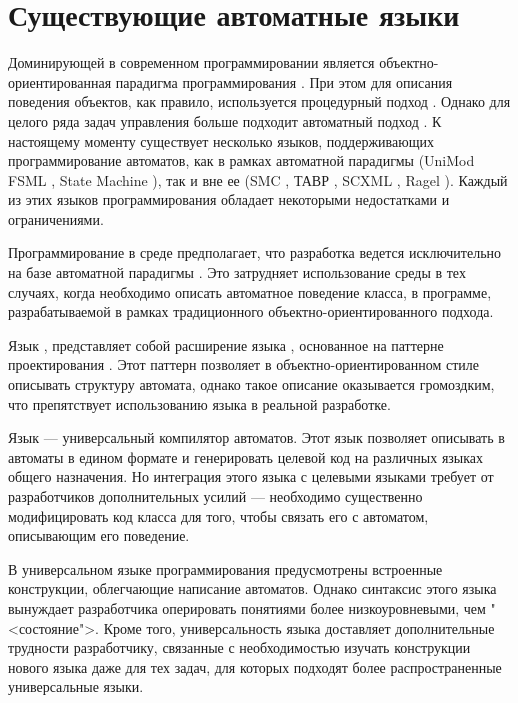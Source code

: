 \section{Существующие автоматные языки}
Доминирующей в современном программировании является объектно-ориентированная парадигма программирования \cite{meyer}. При этом для описания поведения объектов, как правило, используется процедурный подход \cite{nepeyvoda}. Однако для целого ряда задач управления больше подходит автоматный подход \cite{shalyto01,shalyto02}. К настоящему моменту существует несколько языков, поддерживающих программирование автоматов, как в рамках автоматной парадигмы (UniMod FSML \cite{lagunov}, State Machine \cite{shamgunov}), так и вне ее (SMC \cite{smc}, ТАВР \cite{tsimbaluk}, SCXML \cite{scxml}, Ragel \cite{ragel}). Каждый из этих языков программирования обладает некоторыми недостатками и ограничениями.

Программирование в среде  предполагает, что разработка ведется исключительно на базе автоматной парадигмы \cite{myUMLSwitchEclipse}. Это затрудняет использование среды  в тех случаях, когда необходимо описать автоматное поведение класса, в программе, разрабатываемой в рамках традиционного объектно-ориентированного подхода.

Язык , представляет собой расширение языка , основанное на паттерне проектирования  \cite{gof}. Этот паттерн позволяет в объектно-ориентированном стиле описывать структуру автомата, однако такое описание оказывается громоздким, что препятствует использованию языка  в реальной разработке.

Язык  --- универсальный компилятор автоматов. Этот язык позволяет описывать в автоматы в едином формате и генерировать целевой код на различных языках общего назначения. Но интеграция этого языка с целевыми языками требует от разработчиков дополнительных усилий --- необходимо существенно модифицировать код класса для того, чтобы связать его с автоматом, описывающим его поведение.

В универсальном языке программирования  предусмотрены встроенные конструкции, облегчающие написание автоматов. Однако синтаксис этого языка вынуждает разработчика оперировать понятиями более низкоуровневыми, чем "<состояние">. Кроме того, универсальность языка  доставляет дополнительные трудности разработчику, связанные с необходимостью изучать конструкции нового языка даже для тех задач, для которых подходят более распространенные универсальные языки.

